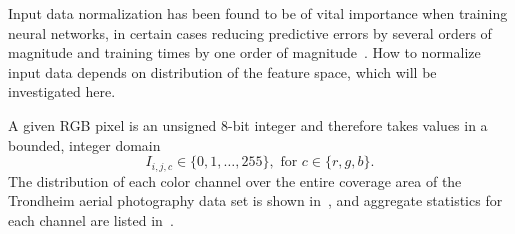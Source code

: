 Input data normalization has been found to be of vital importance when training neural networks, in certain cases reducing predictive errors by several orders of magnitude and training times by one order of magnitude~\cite{input_normalization_1997}.
How to normalize input data depends on distribution of the feature space, which will be investigated here.



A given RGB pixel is an unsigned 8-bit integer and therefore takes values in a bounded, integer domain
%
\begin{equation*}
  I_{i,j,c} \in \{0, 1, \ldots, 255\}, \text{ for } c \in \{r, g, b\}.
\end{equation*}
%
The distribution of each color channel over the entire coverage area of the Trondheim aerial photography data set is shown in~, and aggregate statistics for each channel are listed in~.

\begin{figure}[htb]
  \begin{floatrow}
  \end{floatrow}
\end{figure}

